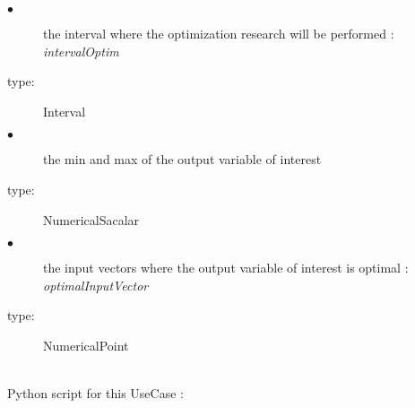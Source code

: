 {
  \begin{description}
  \item[$\bullet$] the interval where the optimization research will be performed : \itshape{intervalOptim}
  \item[type:] Interval
  \item[$\bullet$] the min and max of the output variable of interest
  \item[type:] NumericalSacalar
  \item[$\bullet$] the input vectors where the output variable of interest is optimal : \itshape{optimalInputVector}
  \item[type:] NumericalPoint
  \end{description}
}

\textspace\\
Python script for this UseCase :

